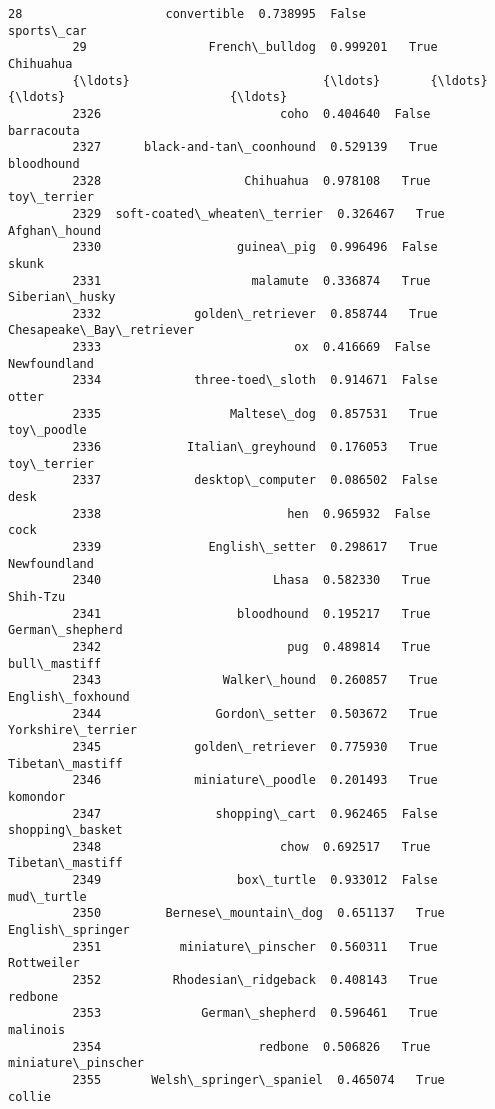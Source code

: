 \documentclass[11pt]{article}
\begin{document}
\begin{Verbatim}[commandchars=\\\{\}]
         28                    convertible  0.738995  False                sports\_car   
         29                 French\_bulldog  0.999201   True                 Chihuahua   
         {\ldots}                           {\ldots}       {\ldots}    {\ldots}                       {\ldots}   
         2326                         coho  0.404640  False                barracouta   
         2327      black-and-tan\_coonhound  0.529139   True                bloodhound   
         2328                    Chihuahua  0.978108   True               toy\_terrier   
         2329  soft-coated\_wheaten\_terrier  0.326467   True              Afghan\_hound   
         2330                   guinea\_pig  0.996496  False                     skunk   
         2331                     malamute  0.336874   True            Siberian\_husky   
         2332             golden\_retriever  0.858744   True  Chesapeake\_Bay\_retriever   
         2333                           ox  0.416669  False              Newfoundland   
         2334             three-toed\_sloth  0.914671  False                     otter   
         2335                  Maltese\_dog  0.857531   True                toy\_poodle   
         2336            Italian\_greyhound  0.176053   True               toy\_terrier   
         2337             desktop\_computer  0.086502  False                      desk   
         2338                          hen  0.965932  False                      cock   
         2339               English\_setter  0.298617   True              Newfoundland   
         2340                        Lhasa  0.582330   True                  Shih-Tzu   
         2341                   bloodhound  0.195217   True           German\_shepherd   
         2342                          pug  0.489814   True              bull\_mastiff   
         2343                 Walker\_hound  0.260857   True          English\_foxhound   
         2344                Gordon\_setter  0.503672   True         Yorkshire\_terrier   
         2345             golden\_retriever  0.775930   True           Tibetan\_mastiff   
         2346             miniature\_poodle  0.201493   True                  komondor   
         2347                shopping\_cart  0.962465  False           shopping\_basket   
         2348                         chow  0.692517   True           Tibetan\_mastiff   
         2349                   box\_turtle  0.933012  False                mud\_turtle   
         2350         Bernese\_mountain\_dog  0.651137   True          English\_springer   
         2351           miniature\_pinscher  0.560311   True                Rottweiler   
         2352          Rhodesian\_ridgeback  0.408143   True                   redbone   
         2353              German\_shepherd  0.596461   True                  malinois   
         2354                      redbone  0.506826   True        miniature\_pinscher   
         2355       Welsh\_springer\_spaniel  0.465074   True                    collie   
         

\end{Verbatim}
\end{document}
